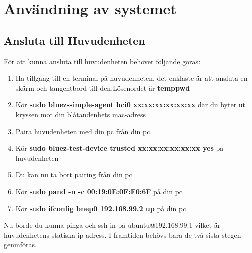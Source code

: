 \section{Användning av systemet}

\subsection{Ansluta till Huvudenheten}
För att kunna ansluta till huvudenheten behöver följande göras:
\begin{enumerate}
	\item Ha tillgång till en terminal på huvudenheten, det enklaste är att ansluta en skärm och tangentbord till den.\newline Lösenordet är \textbf{temppwd}
	\item Kör \textbf{sudo bluez-simple-agent hci0 xx:xx:xx:xx:xx:xx} där du byter ut kryssen mot din blåtandenhets mac-adress
	\item Paira huvudenheten med din pc från din pc
	\item Kör \textbf{sudo bluez-test-device trusted xx:xx:xx:xx:xx:xx yes} på huvudenheten
	\item Du kan nu ta bort pairing från din pc
	\item Kör \textbf{sudo pand -n -c 00:19:0E:0F:F0:6F	} på din pc
	\item Kör \textbf{sudo ifconfig bnep0 192.168.99.2 up } på din pc
\end{enumerate}
Nu borde du kunna pinga och ssh in på ubuntu@192.168.99.1 vilket är huvudenhetens statiska ip-adress. I framtiden behövs bara de två sista stegen genmföras.
